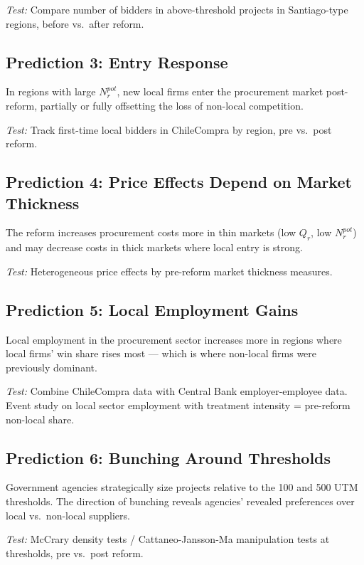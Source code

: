 \documentclass[10pt]{article}
\begin{document}
\noindent\emph{Test:} Compare number of bidders in above-threshold projects in Santiago-type regions, before vs.\ after reform.

\subsection*{Prediction 3: Entry Response}
In regions with large $N_r^{pot}$, new local firms enter the procurement market post-reform, partially or fully offsetting the loss of non-local competition.

\noindent\emph{Test:} Track first-time local bidders in ChileCompra by region, pre vs.\ post reform.

\subsection*{Prediction 4: Price Effects Depend on Market Thickness}
The reform increases procurement costs more in thin markets (low $Q_r$, low $N_r^{pot}$) and may decrease costs in thick markets where local entry is strong.

\noindent\emph{Test:} Heterogeneous price effects by pre-reform market thickness measures.

\subsection*{Prediction 5: Local Employment Gains}
Local employment in the procurement sector increases more in regions where local firms' win share rises most --- which is where non-local firms were previously dominant.

\noindent\emph{Test:} Combine ChileCompra data with Central Bank employer-employee data. Event study on local sector employment with treatment intensity = pre-reform non-local share.

\subsection*{Prediction 6: Bunching Around Thresholds}
Government agencies strategically size projects relative to the 100 and 500 UTM thresholds. The direction of bunching reveals agencies' revealed preferences over local vs.\ non-local suppliers.

\noindent\emph{Test:} McCrary density tests / Cattaneo-Jansson-Ma manipulation tests at thresholds, pre vs.\ post reform.
\end{document}

